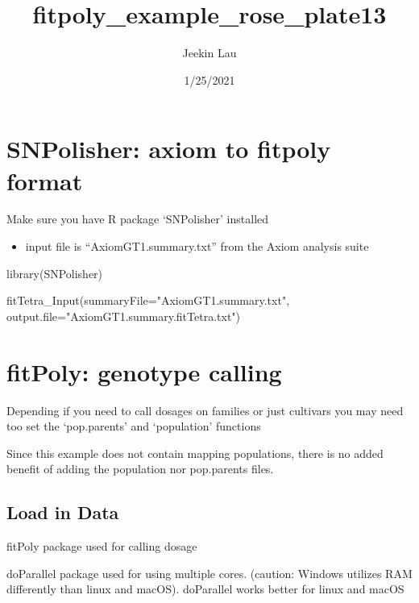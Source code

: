 \documentclass[
]{article}
\title{fitpoly\_example\_rose\_plate13}
\author{Jeekin Lau}
\date{1/25/2021}
\newenvironment{Shaded}{\begin{snugshade}}{\end{snugshade}}
\newcommand{\AttributeTok}[1]{\textcolor[rgb]{0.77,0.63,0.00}{#1}}
\newcommand{\FunctionTok}[1]{\textcolor[rgb]{0.00,0.00,0.00}{#1}}
\newcommand{\NormalTok}[1]{#1}
\newcommand{\StringTok}[1]{\textcolor[rgb]{0.31,0.60,0.02}{#1}}
\providecommand{\tightlist}{%
  \setlength{\itemsep}{0pt}\setlength{\parskip}{0pt}}
\begin{document}
\maketitle

{
\setcounter{tocdepth}{2}
\tableofcontents
}
\hypertarget{snpolisher-axiom-to-fitpoly-format}{%
\section{SNPolisher: axiom to fitpoly
format}\label{snpolisher-axiom-to-fitpoly-format}}

Make sure you have R package `SNPolisher' installed

\begin{itemize}
\tightlist
\item
  input file is ``AxiomGT1.summary.txt'' from the Axiom analysis suite
\end{itemize}

\begin{Shaded}
\begin{Highlighting}[]
\FunctionTok{library}\NormalTok{(SNPolisher)}

\FunctionTok{fitTetra\_Input}\NormalTok{(}\AttributeTok{summaryFile=}\StringTok{"AxiomGT1.summary.txt"}\NormalTok{,}
               \AttributeTok{output.file=}\StringTok{"AxiomGT1.summary.fitTetra.txt"}\NormalTok{)}
\end{Highlighting}
\end{Shaded}

\hypertarget{fitpoly-genotype-calling}{%
\section{fitPoly: genotype calling}\label{fitpoly-genotype-calling}}

Depending if you need to call dosages on families or just cultivars you
may need too set the `pop.parents' and `population' functions

Since this example does not contain mapping populations, there is no
added benefit of adding the population nor pop.parents files.

\hypertarget{load-in-data}{%
\subsection{Load in Data}\label{load-in-data}}

fitPoly package used for calling dosage

doParallel package used for using multiple cores. (caution: Windows
utilizes RAM differently than linux and macOS). doParallel works better
for linux and macOS
\end{document}
